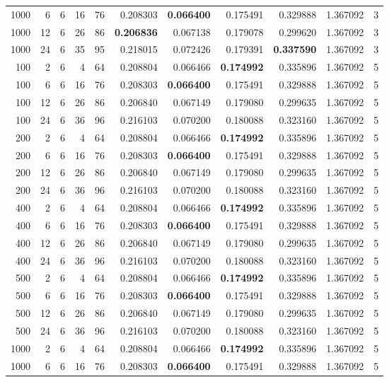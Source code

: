\begin{table}
\begin{tabular}{rrrrrrrrrrr}
1000 & 6 & 6 & 16 & 76 & 0.208303 & \textbf{0.066400} & 0.175491 & 0.329888 & 1.367092 & 3 \\
1000 & 12 & 6 & 26 & 86 & \textbf{0.206836} & 0.067138 & 0.179078 & 0.299620 & 1.367092 & 3 \\
1000 & 24 & 6 & 35 & 95 & 0.218015 & 0.072426 & 0.179391 & \textbf{0.337590} & 1.367092 & 3 \\
100 & 2 & 6 & 4 & 64 & 0.208804 & 0.066466 & \textbf{0.174992} & 0.335896 & 1.367092 & 5 \\
100 & 6 & 6 & 16 & 76 & 0.208303 & \textbf{0.066400} & 0.175491 & 0.329888 & 1.367092 & 5 \\
100 & 12 & 6 & 26 & 86 & 0.206840 & 0.067149 & 0.179080 & 0.299635 & 1.367092 & 5 \\
100 & 24 & 6 & 36 & 96 & 0.216103 & 0.070200 & 0.180088 & 0.323160 & 1.367092 & 5 \\
200 & 2 & 6 & 4 & 64 & 0.208804 & 0.066466 & \textbf{0.174992} & 0.335896 & 1.367092 & 5 \\
200 & 6 & 6 & 16 & 76 & 0.208303 & \textbf{0.066400} & 0.175491 & 0.329888 & 1.367092 & 5 \\
200 & 12 & 6 & 26 & 86 & 0.206840 & 0.067149 & 0.179080 & 0.299635 & 1.367092 & 5 \\
200 & 24 & 6 & 36 & 96 & 0.216103 & 0.070200 & 0.180088 & 0.323160 & 1.367092 & 5 \\
400 & 2 & 6 & 4 & 64 & 0.208804 & 0.066466 & \textbf{0.174992} & 0.335896 & 1.367092 & 5 \\
400 & 6 & 6 & 16 & 76 & 0.208303 & \textbf{0.066400} & 0.175491 & 0.329888 & 1.367092 & 5 \\
400 & 12 & 6 & 26 & 86 & 0.206840 & 0.067149 & 0.179080 & 0.299635 & 1.367092 & 5 \\
400 & 24 & 6 & 36 & 96 & 0.216103 & 0.070200 & 0.180088 & 0.323160 & 1.367092 & 5 \\
500 & 2 & 6 & 4 & 64 & 0.208804 & 0.066466 & \textbf{0.174992} & 0.335896 & 1.367092 & 5 \\
500 & 6 & 6 & 16 & 76 & 0.208303 & \textbf{0.066400} & 0.175491 & 0.329888 & 1.367092 & 5 \\
500 & 12 & 6 & 26 & 86 & 0.206840 & 0.067149 & 0.179080 & 0.299635 & 1.367092 & 5 \\
500 & 24 & 6 & 36 & 96 & 0.216103 & 0.070200 & 0.180088 & 0.323160 & 1.367092 & 5 \\
1000 & 2 & 6 & 4 & 64 & 0.208804 & 0.066466 & \textbf{0.174992} & 0.335896 & 1.367092 & 5 \\
1000 & 6 & 6 & 16 & 76 & 0.208303 & \textbf{0.066400} & 0.175491 & 0.329888 & 1.367092 & 5 \\

\end{tabular}
\end{table}

